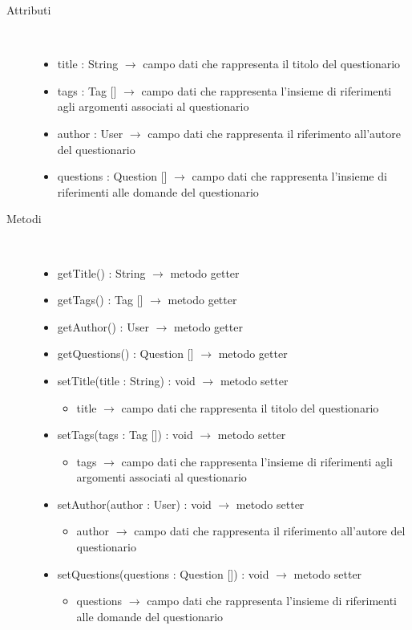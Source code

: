 \begin{description}
\item[Attributi] \hfill \\
\vspace{-7mm}
\begin{itemize}
	\item title : String $\rightarrow$ campo dati che rappresenta il titolo del questionario
	\item tags : Tag [] $\rightarrow$ campo dati che rappresenta l'insieme di riferimenti agli argomenti associati al questionario
	\item author : User $\rightarrow$ campo dati che rappresenta il riferimento all'autore del questionario
	\item questions : Question [] $\rightarrow$ campo dati che rappresenta l'insieme di riferimenti alle domande del questionario
\end{itemize}

\item[Metodi] \hfill \\
\vspace{-7mm}
\begin{itemize}
	\item getTitle() : String $\rightarrow$ metodo getter
	\item getTags() : Tag [] $\rightarrow$ metodo getter
	\item getAuthor() : User $\rightarrow$ metodo getter
	\item getQuestions() : Question [] $\rightarrow$ metodo getter
	\item setTitle(title : String) : void $\rightarrow$ metodo setter\begin{itemize}
		\item title $\rightarrow$ campo dati che rappresenta il titolo del questionario
	\end{itemize}
	
	\item setTags(tags : Tag []) : void $\rightarrow$ metodo setter\begin{itemize}
		\item tags $\rightarrow$ campo dati che rappresenta l'insieme di riferimenti agli argomenti associati al questionario
	\end{itemize}
	
	\item setAuthor(author : User) : void $\rightarrow$ metodo setter\begin{itemize}
		\item author $\rightarrow$ campo dati che rappresenta il riferimento all'autore del questionario
	\end{itemize}
	
	\item setQuestions(questions : Question []) : void $\rightarrow$ metodo setter\begin{itemize}
		\item questions $\rightarrow$ campo dati che rappresenta l'insieme di riferimenti alle domande del questionario
	\end{itemize}
	
\end{itemize}

\end{description}

